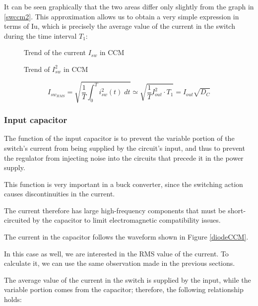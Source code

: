 \documentclass[../main.tex]{subfiles}
\begin{document}
It can be seen graphically that the two areas differ only slightly from the graph in \autoref{swccm2}. This approximation allows us to obtain a very simple expression in terms of Iu, which is precisely the average value of the current in the switch during the time interval $T_1$:




\begin{figure}[h!]
\begin{center}


\label{swccm1}
\caption{Trend of the current $I_{sw}$ in CCM}	
\end{center}
\end{figure}

\begin{figure}[h!]
\begin{center}


\label{swccm2}
\caption{Trend of $I^2_{sw}$ in CCM}	
\end{center}
\end{figure}


\begin{equation}
	I_{sw_{RMS}} = \sqrt{\frac{1}{T} \int_0^T i^2_{sw} (t)\; dt } \simeq \sqrt{\frac{1}{T} I^2_{out} \cdot T_1} = I_{out} \sqrt{D_C}
\end{equation}


\subsubsection*{Input capacitor}

The function of the input capacitor is to prevent the variable portion of the switch’s current from being supplied by the circuit’s input, and thus to prevent the regulator from injecting noise into the circuits that precede it in the power supply. 

This function is very important in a buck converter, since the switching action causes discontinuities in the current. 

The current therefore has large high-frequency components that must be short-circuited by the capacitor to limit electromagnetic compatibility issues.

The current in the capacitor follows the waveform shown in Figure \autoref{diodeCCM}.

In this case as well, we are interested in the RMS value of the current. To calculate it, we can use the same observation made in the previous sections.

The average value of the current in the switch is supplied by the input, while the variable portion comes from the capacitor; therefore, the following relationship holds:
\end{document}
